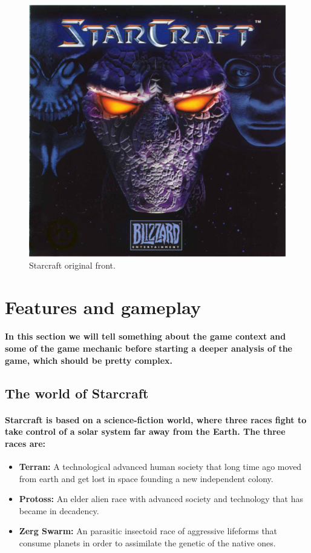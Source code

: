 \documentclass[a4paper,10pt]{article}
\newcommand{\p}[1]{\paragraph{\indent\textnormal{#1}}}
\begin{document}
  \begin{figure}[hbt]
  \begin{center}
  \includegraphics[scale=.5]{figs/logo.jpeg}
  \end{center}
  \caption{Starcraft original front.}
  \label{fig:rb1}
  \end{figure}

\newpage
\section{Features and gameplay}

  \p{In this section we will tell something about the game context and some of the game mechanic before starting a deeper analysis of the game, which should be pretty complex.}

  \subsection{The world of Starcraft}

    \p{Starcraft is based on a science-fiction world, where three races fight to take control of a solar system far away from the Earth. The three races are:}

    \begin{itemize}
     \item \textbf{Terran:} A technological advanced human society that long time ago moved from earth and get lost in space founding a new independent colony.
     \item \textbf{Protoss:} An elder alien race with advanced society and technology that has became in decadency.
     \item \textbf{Zerg Swarm:} An parasitic insectoid race of aggressive lifeforms that consume planets in order to assimilate the genetic of the native ones.
    \end{itemize}
\end{document}
